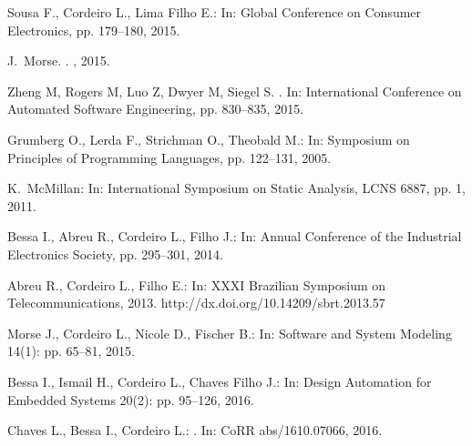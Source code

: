 \documentclass{acm_sen_article}
\begin{document}
{{\begin{thebibliography}{1}
Sousa F., Cordeiro L., Lima Filho E.: 
\newblock In: Global Conference on Consumer Electronics, pp. 179--180, 2015.

J.~Morse.
.
, 2015.

Zheng M, Rogers M, Luo Z, Dwyer M, Siegel S.
.
\newblock In: International Conference on Automated Software Engineering, pp. 830--835, 2015.

Grumberg O., Lerda F., Strichman O., Theobald M.:
\newblock In: Symposium on Principles of Programming Languages, pp. 122--131, 2005.

K.~McMillan:
\newblock In: International Symposium on Static Analysis, LCNS 6887, pp. 1, 2011.

Bessa I., Abreu R., Cordeiro L., Filho J.:
\newblock In: Annual Conference of the Industrial Electronics Society, pp. 295--301, 2014.

Abreu R., Cordeiro L., Filho E.:
\newblock In: XXXI Brazilian Symposium on Telecommunications, 2013.
\newblock http://dx.doi.org/10.14209/sbrt.2013.57

Morse J., Cordeiro L., Nicole D., Fischer B.:
\newblock In: Software and System Modeling 14(1): pp. 65--81, 2015.

Bessa I., Ismail H., Cordeiro L., Chaves Filho J.:
\newblock In: Design Automation for Embedded Systems 20(2): pp. 95--126, 2016.

Chaves L., Bessa I., Cordeiro L.:
. 
\newblock In: CoRR abs/1610.07066, 2016.


\end{thebibliography}}}
\end{document}
